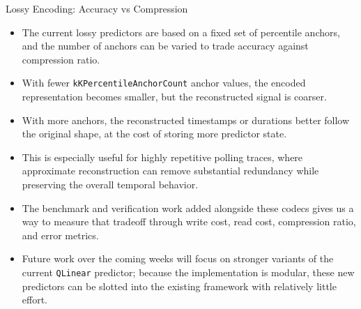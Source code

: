 \documentclass[10pt,aspectratio=169]{beamer}
\begin{document}
\begin{frame}{Lossy Encoding: Accuracy vs Compression}
  \small
  \begin{itemize}
    \item<1-> The current lossy predictors are based on a fixed set of percentile anchors, and the number of anchors can be varied to trade accuracy against compression ratio.
    \item<2-> With fewer \texttt{kKPercentileAnchorCount} anchor values, the encoded representation becomes smaller, but the reconstructed signal is coarser.
    \item<3-> With more anchors, the reconstructed timestamps or durations better follow the original shape, at the cost of storing more predictor state.
    \item<4-> This is especially useful for highly repetitive polling traces, where approximate reconstruction can remove substantial redundancy while preserving the overall temporal behavior.
    \item<5-> The benchmark and verification work added alongside these codecs gives us a way to measure that tradeoff through write cost, read cost, compression ratio, and error metrics.
    \item<6-> Future work over the coming weeks will focus on stronger variants of the current \texttt{QLinear} predictor; because the implementation is modular, these new predictors can be slotted into the existing framework with relatively little effort.
  \end{itemize}
\end{frame}
\end{document}
